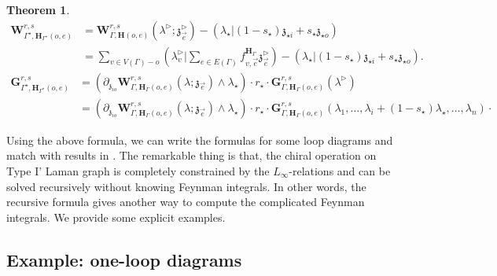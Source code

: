 \documentclass[11pt]{amsart}
\newtheorem{thm}{Theorem}[section]
\newtheorem{cor}[thm]{Corollary}
\theoremstyle{definition}
\theoremstyle{remark}
\numberwithin{equation}{section}
\begin{document}
\begin{thm}
\begin{align*}
      \mathbf{W}^{r,s}_{\Gamma^{\star},\mathbf{H}_{\Gamma^{\star}}(o,e)} &= \mathbf{W}^{r,s}_{\Gamma,\mathbf{H}(o,e)}(\lambda^\triangleright;\mathfrak{z}^\triangleright_{\vec{e}}) -\left(\lambda_{\star}|(1-s_{\star})\mathfrak{z}_{\star i}+s_{\star}\mathfrak{z}_{\star o}\right)\\
   & =\sum_{v\in V(\Gamma)-o}(\lambda^\triangleright_v|\sum_{e\in E(\Gamma)}f^{\mathbf{H}_{\Gamma}}_{v,\vec{e}}\mathfrak{z}^\triangleright_{\vec{e}})-\left(\lambda_{\star}|(1-s_{\star})\mathfrak{z}_{\star i}+s_{\star}\mathfrak{z}_{\star o}\right).
\end{align*}
\begin{align*}
  \mathbf{G}^{r,s}_{\Gamma^{\star},\mathbf{H}_{\Gamma^{\star}}(o,e)} &= \left(\partial_{\mathfrak{z}_{io}}\mathbf{W}^{r,s}_{\Gamma,\mathbf{H}_{\Gamma}(o,e)}(\lambda;\mathfrak{z}_{\vec{e}})\wedge\lambda_{\star}\right)\cdot  r_{\star}\cdot\mathbf{G}^{r,s}_{\Gamma,\mathbf{H}_{\Gamma}(o,e)}(\lambda^\triangleright) \\
   & =\left(\partial_{\mathfrak{z}_{io}}\mathbf{W}^{r,s}_{\Gamma,\mathbf{H}_{\Gamma}(o,e)}(\lambda;\mathfrak{z}_{\vec{e}})\wedge\lambda_{\star}\right)\cdot r_{\star}\cdot\mathbf{G}^{r,s}_{\Gamma,\mathbf{H}_{\Gamma}(o,e)}(\lambda_1,\dots,\lambda_i+(1-s_{\star})\lambda_{\star},\dots,\lambda_{n})\cdot
\end{align*}

\end{thm}

\iffalse
We have following corollaries.
\begin{cor}
  The value $\mu_{V(\Gamma)}\left(W_{\Gamma}(\mathfrak{z}_{\vec{e}})\right)$ for a type 1 Lamman graph is determined by the chiral 2-operation.
\end{cor}
\fi

Using the above formula, we can write the formulas for some loop diagrams and match with results in \cite{Gaiotto:2024gii}. 
The remarkable thing is that, the chiral operation on Type I' Laman graph is completely constrained by the $L_{\infty}
$-relations and can be solved recursively without knowing Feynman integrals. 
In other words, the recursive formula gives another way to compute the complicated Feynman integrals. 
We provide some explicit examples.

\subsection{Example: one-loop diagrams}\label{s:2d1loop}
\end{document}
